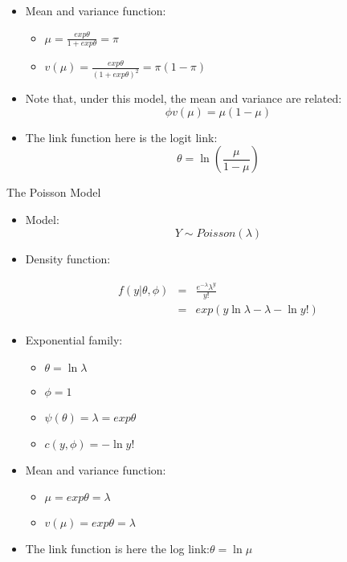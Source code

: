 \documentclass{beamer}
\begin{document}
\begin{frame}{}
\begin{itemize}
	\item Mean and variance function: 
	\begin{itemize}
		\item $\mu=\frac{exp\theta}{1+exp\theta}=\pi$
		\item $v(\mu)=\frac{exp\theta}{(1+exp\theta)^{2}}=\pi(1-\pi)$
	\end{itemize}
\item Note that, under this model, the mean and variance are related:
\[\phi v(\mu)=\mu(1-\mu)\]
\item The link function here is the logit link:
\[\theta=\ln(\frac{\mu}{1-\mu}) \]
\end{itemize}
\end{frame}

\begin{frame}{The Poisson Model}
\begin{itemize}
	\item Model:
	\[Y\sim Poisson(\lambda) \]
	\item Density function:
	
		\begin{eqnarray*}
		\begin{array}{lll}
	f(y|\theta,\phi)&=&\frac{e^{-\lambda}\lambda^{y}}{y!} \\
	                &=&exp\left(y\ln\lambda-\lambda-\ln y!\right)
			\end{array}
\end{eqnarray*}
\item Exponential family:
\begin{itemize}
	\item $\theta=\ln\lambda$
	\item $\phi=1$
	\item $\psi(\theta)=\lambda=exp\theta$
	\item $c(y,\phi)=-\ln y!$
\end{itemize}
\item Mean and variance function:
\begin{itemize}
	\item $\mu=exp\theta=\lambda$
	\item $v(\mu)=exp\theta=\lambda$
\end{itemize}
\item The link function is here the log link:$\theta=\ln\mu$
\end{itemize}
\end{frame}
\end{document}
